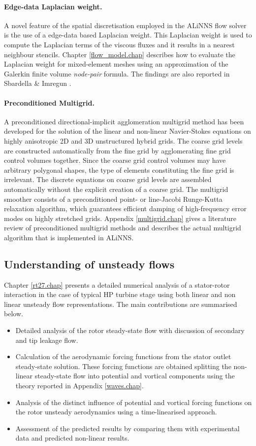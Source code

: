 \paragraph{Edge-data Laplacian weight.}
%
 A novel feature of the spatial discretisation employed in
 the ALiNNS flow solver is the use of a edge-data based Laplacian weight.
 This Laplacian weight is used to compute the Laplacian terms of the
 viscous fluxes and it results in a nearest neighbour stencils.
 Chapter \ref{flow_model.chap} describes how to evaluate the Laplacian weight
 for mixed-element meshes using an approximation of the
 Galerkin finite volume {\em node-pair} formula.
 The findings are also reported in Sbardella \& Imregun \citeyear{Luca:7,Luca:11}.
%
%
\paragraph{Preconditioned Multigrid.}
%
 A preconditioned directional-implicit agglomeration multigrid method
 has been developed for the solution of the linear and non-linear
 Navier-Stokes equations on highly anisotropic 2D and 3D unstructured hybrid grids.
 The coarse grid levels are constructed
 automatically from the fine grid by agglomerating fine grid control
 volumes together. Since the coarse grid control volumes may have arbitrary
 polygonal shapes, the type of elements constituting the fine grid is
 irrelevant. The discrete equations on coarse grid levels
 are assembled automatically without the explicit creation of a coarse grid.
 The multigrid smoother consists of a preconditioned
 point- or line-Jacobi Runge-Kutta relaxation algorithm, which guarantees
 efficient damping of high-frequency error modes on highly stretched grids.
 Appendix \ref{multigrid.chap} gives a literature review of preconditioned
 multigrid methods and describes the actual multigrid algorithm that is
 implemented in ALiNNS.
%
% 
%
\subsection{Understanding of unsteady flows}
%
 Chapter \ref{rt27.chap} presents a detailed  numerical analysis of a stator-rotor
 interaction in the case of typical HP turbine stage
 using both linear and non linear unsteady flow representations.
 The main contributions are summarised below.
%
\begin{itemize}
%
\item
 Detailed analysis of the rotor steady-state flow with discussion
 of secondary and tip leakage flow.
%
\item
 Calculation of the aerodynamic forcing functions from the
 stator outlet steady-state solution. These forcing functions
 are obtained splitting the non-linear steady-state flow
 into potential and vortical components using the theory
 reported in Appendix \ref{waves.chap}.
%
\item
 Analysis of the distinct influence of potential and vortical forcing functions
 on the rotor unsteady aerodynamics using a time-linearised approach.
%
\item
 Assessment of the predicted results by comparing them with
 experimental data and predicted non-linear results.
%
\end{itemize}
%
